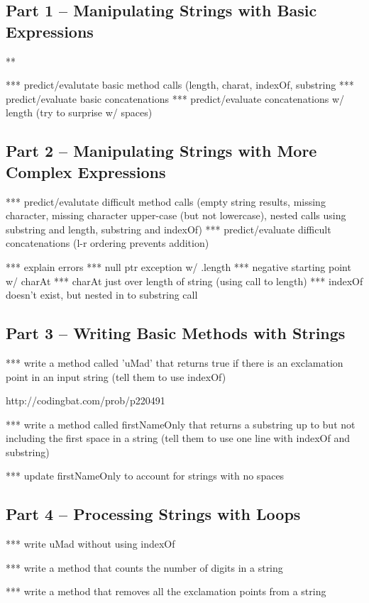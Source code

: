 \subsection{Part 1 -- Manipulating Strings with Basic Expressions}

\begin{eval}
\begin{sevalenum}
\item ***
\evalline
\end{sevalenum}
\end{eval}
*** predict/evalutate basic method calls (length, charat, indexOf, substring
*** predict/evaluate basic concatenations
*** predict/evaluate concatenations w/ length (try to surprise w/ spaces)



\subsection{Part 2 -- Manipulating Strings with More Complex Expressions}
*** predict/evalutate difficult method calls (empty string results, missing character, missing character upper-case (but not lowercase), nested calls using substring and length, substring and indexOf)
*** predict/evaluate difficult concatenations (l-r ordering prevents addition)

*** explain errors
	*** null ptr exception w/ .length
	*** negative starting point w/ charAt
	*** charAt just over length of string (using call to length)
	*** indexOf doesn't exist, but nested in to substring call


\initialbox

\subsection{Part 3 -- Writing Basic Methods with Strings}

*** write a method called 'uMad' that returns true if there is an exclamation point in an input string (tell them to use indexOf)

http://codingbat.com/prob/p220491

*** write a method called firstNameOnly that returns a substring up to but not including the first space in a string (tell them to use one line with indexOf and substring)

*** update firstNameOnly to account for strings with no spaces

\initialbox


\subsection{Part 4 -- Processing Strings with Loops}

*** write uMad without using indexOf

*** write a method that counts the number of digits in a string

*** write a method that removes all the exclamation points from a string

\initialbox

